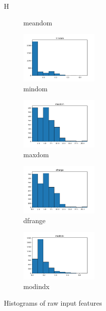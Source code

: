 \documentclass[a4paper]{article}    %
\begin{document}
\begin{figure}{H}
\begin{subfigure}{0.32\textwidth}
        \caption{meandom}
        \label{fig:sub_raw_15}
    \end{subfigure}\hfill
    \begin{subfigure}{0.32\textwidth}
        \centering
        \includegraphics[width=3.85cm]{raw_15_mindom}
        \caption{mindom}
        \label{fig:sub_raw_16}
    \end{subfigure}\hfill
    \begin{subfigure}{0.32\textwidth}
        \centering
        \includegraphics[width=3.85cm]{raw_16_maxdom}
        \caption{maxdom}
        \label{fig:sub_raw_17}
    \end{subfigure}\hfill
    \begin{subfigure}{0.32\textwidth}
        \centering
        \includegraphics[width=3.85cm]{raw_17_dfrange}
        \caption{dfrange}
        \label{fig:sub_raw_18}
    \end{subfigure}\hfill
    \begin{subfigure}{0.32\textwidth}
        \centering
        \includegraphics[width=3.85cm]{raw_18_modindx}
        \caption{modindx}
        \label{fig:sub_raw_19}
    \end{subfigure}
    \caption{Histograms of raw input features}
    \label{fig:pre-ex1-raw_histograms}
\end{figure}
\end{document}
